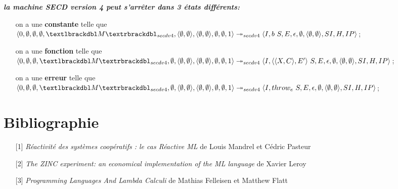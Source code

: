 \documentclass[10pt,a4paper]{article}
\begin{document}
					
				\textbf{\textit{la machine SECD version 4 peut s'arrêter dans 3 états différents:}}
				\smallbreak
				\begin{itemize}
					\item[] on a une \textbf{constante} telle que $\langle 0,\emptyset,\emptyset,\emptyset,\textlbrackdbl M\textrbrackdbl_{secdv4},\langle\emptyset,\emptyset\rangle,\langle\emptyset,\emptyset\rangle,\emptyset,\emptyset,1\rangle \\
					\twoheadrightarrow_{secdv4} \langle I,b~S,E,\epsilon,\emptyset,\langle\emptyset,\emptyset\rangle,SI,H,IP\rangle$;
					\item[] 
					\item[] on a une \textbf{fonction} telle que
					$\langle 0,\emptyset,\emptyset,\textlbrackdbl M\textrbrackdbl_{secdv4},\emptyset,\langle\emptyset,\emptyset\rangle,\langle\emptyset,\emptyset\rangle,\emptyset,\emptyset,1\rangle \\
					\twoheadrightarrow_{secdv4} \langle I,\langle\langle X,C\rangle,E'\rangle~S,E,\epsilon,\emptyset,\langle\emptyset,\emptyset\rangle,SI,H,IP\rangle$;
					\item[] 
					\item[] on a une \textbf{erreur} telle que 
					$\langle 0,\emptyset,\emptyset,\textlbrackdbl M\textrbrackdbl_{secdv4},\emptyset,\langle\emptyset,\emptyset\rangle,\langle\emptyset,\emptyset\rangle,\emptyset,\emptyset,1\rangle \\
					\twoheadrightarrow_{secdv4} \langle I,throw_{e}~S,E,\epsilon,\emptyset,\langle\emptyset,\emptyset\rangle,SI,H,IP\rangle$;
				\end{itemize}
				\newpage
			
			
					
	\section{Bibliographie}
		\begin{itemize}
			\item[] [1] \textit{Réactivité des systèmes coopératifs : le cas Réactive ML} de Louis Mandrel et Cédric Pasteur\label{ReactiveML}
			\item[] [2] \textit{The ZINC experiment: an economical implementation of the ML language} de Xavier Leroy\label{ZINC}
			\item[] [3] \textit{Programming Languages And Lambda Calculi} de Mathias Felleisen et Matthew Flatt\label{Calculi}
		\end{itemize}
		
		
\end{document}
